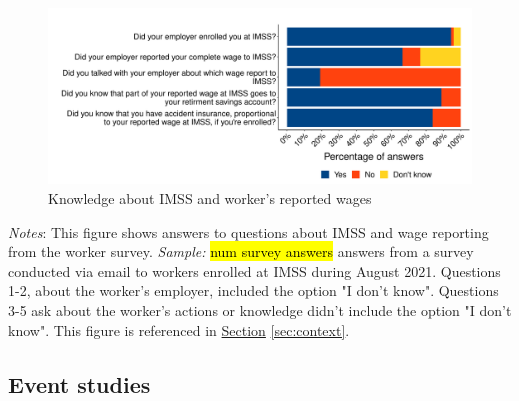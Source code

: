 \documentclass[oneside,11pt]{article}
\begin{document}
\begin{figure}[H]
    \centering
    \caption{Knowledge about IMSS and worker's reported wages \label{fig:hist_knowledge_register_survey}}
    \includegraphics[width=\textwidth]{04_Figures/worker_survey/hist_knowledge_register_survey.pdf}
\end{figure}
\scriptsize{\textit{Notes}: This figure shows answers to questions about IMSS and wage reporting from the worker survey. \textit{Sample:} \hl{num survey answers} answers from a survey conducted via email to workers enrolled at IMSS during August 2021. Questions 1-2, about the worker's employer, included the option "I don't know". Questions 3-5 ask about the worker's actions or knowledge didn't include the option "I don't know".  This figure is referenced in \hyperref[sec:context]{Section} \ref{sec:context}.}

\clearpage

\subsection{Event studies}
\end{document}

